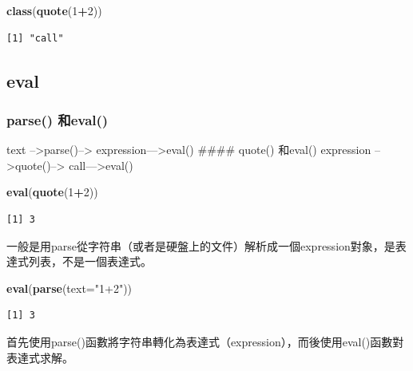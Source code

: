 \documentclass[]{book}
\newenvironment{Shaded}{\begin{snugshade}}{\end{snugshade}}
\newcommand{\DataTypeTok}[1]{\textcolor[rgb]{0.13,0.29,0.53}{#1}}
\newcommand{\DecValTok}[1]{\textcolor[rgb]{0.00,0.00,0.81}{#1}}
\newcommand{\KeywordTok}[1]{\textcolor[rgb]{0.13,0.29,0.53}{\textbf{#1}}}
\newcommand{\NormalTok}[1]{#1}
\newcommand{\OperatorTok}[1]{\textcolor[rgb]{0.81,0.36,0.00}{\textbf{#1}}}
\newcommand{\StringTok}[1]{\textcolor[rgb]{0.31,0.60,0.02}{#1}}
\theoremstyle{definition}
\theoremstyle{definition}
\theoremstyle{definition}
\theoremstyle{remark}
\begin{document}
\begin{Shaded}
\begin{Highlighting}[]
 \KeywordTok{class}\NormalTok{(}\KeywordTok{quote}\NormalTok{(}\DecValTok{1}\OperatorTok{+}\DecValTok{2}\NormalTok{))}
\end{Highlighting}
\end{Shaded}

\begin{verbatim}
[1] "call"
\end{verbatim}

\hypertarget{eval}{%
\subsection{\texorpdfstring{\textbf{eval}}{eval}}\label{eval}}

\hypertarget{parse-eval}{%
\subsubsection{parse() 和eval()}\label{parse-eval}}

text --\textgreater{}parse()--\textgreater{}
expression---\textgreater{}eval() \#\#\#\# quote() 和eval() expression
--\textgreater{}quote()--\textgreater{} call---\textgreater{}eval()

\begin{Shaded}
\begin{Highlighting}[]
 \KeywordTok{eval}\NormalTok{(}\KeywordTok{quote}\NormalTok{(}\DecValTok{1}\OperatorTok{+}\DecValTok{2}\NormalTok{))}
\end{Highlighting}
\end{Shaded}

\begin{verbatim}
[1] 3
\end{verbatim}

一般是用parse從字符串（或者是硬盤上的文件）解析成一個expression對象，是表達式列表，不是一個表達式。

\begin{Shaded}
\begin{Highlighting}[]
 \KeywordTok{eval}\NormalTok{(}\KeywordTok{parse}\NormalTok{(}\DataTypeTok{text=}\StringTok{"1+2"}\NormalTok{))}
\end{Highlighting}
\end{Shaded}

\begin{verbatim}
[1] 3
\end{verbatim}

首先使用parse()函數將字符串轉化為表達式（expression），而後使用eval()函數對表達式求解。
\end{document}
